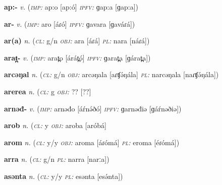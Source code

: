 \newentry
\headword\textbf{ap:-}
\ipa{[ap:-]}
\synpos\textit{v.} 
\imperative(\textit {\textsc{imp:}} ap:o [ap:ó] 
\imperfective\textit{\textsc{ipfv:}} ɡap:a [ɡap:a])

\newentry
\headword\textbf{ar-}
\ipa{[áɾ-]}
\synpos\textit{v.} 
\imperative(\textit {\textsc{imp:}} aro [áɾó] 
\imperfective\textit{\textsc{ipfv:}} ɡavara [ɡaváɾá])

\newentry
\headword\textbf{ar(a)}
\ipa{[áɾ(á)]}
\synpos\textit{n.} 
\class(\textit{\textsc{cl:}} {g/n}
\object\textit{\textsc{obj:}} ara [áɾá]
\plural\textit{\textsc{pl:}} nara [náɾá])


\newentry
\headword\textbf{arat̪-}
\ipa{[árát̪-]}
\synpos\textit{v.} 
\imperative(\textit {\textsc{imp:}} arat̪o [árát̪ó] 
\imperfective\textit{\textsc{ipfv:}} ɡarat̪a [ɡárat̪a])

\newentry
\headword\textbf{arcəŋal}
\ipa{[aɾʧə́ŋál]}
\synpos\textit{n.} 
\class(\textit{\textsc{cl:}} {g/n}
\object\textit{\textsc{obj:}} arcəŋala [aɾʧə́ŋála]
\plural\textit{\textsc{pl:}} narcəŋala [naɾʧə́ŋála])

\newentry
\headword\textbf{arerea}
\ipa{[aɾeɾea]}
\synpos\textit{n.} 
\class(\textit{\textsc{cl:}} {g}
\object\textit{\textsc{obj:}} ?? [??] %

\newentry
\headword\textbf{arnəđ-}
\ipa{[áŕnə́ð-]}
\synpos\textit{v.} 
\imperative(\textit {\textsc{imp:}} arnəđo [áŕnə́ðó] 
\imperfective\textit{\textsc{ipfv:}} ɡarnəđiə [ɡáŕnəðiə])

\newentry
\headword\textbf{arob}
\ipa{[arób]}
\synpos\textit{n.} 
\class(\textit{\textsc{cl:}} {y}
\object\textit{\textsc{obj:}} aroba [aróbá]

\newentry
\headword\textbf{arom}
\ipa{[áɾóm]}
\synpos\textit{n.} 
\class(\textit{\textsc{cl:}} {y/y}
\object\textit{\textsc{obj:}} aroma [áɾómá]
\plural\textit{\textsc{pl:}} eroma [éɾómá])

\newentry
\headword\textbf{arra}
\ipa{[arːa]}
\synpos\textit{n.} 
\class(\textit{\textsc{cl:}} {g/n}
\plural\textit{\textsc{pl:}} narra [narːa])

\newentry
\headword\textbf{asənta}
\synpos\textit{n.} 
\class(\textit{\textsc{cl:}} {y/y}
\plural\textit{\textsc{pl:}} esənta [esə́nta])

